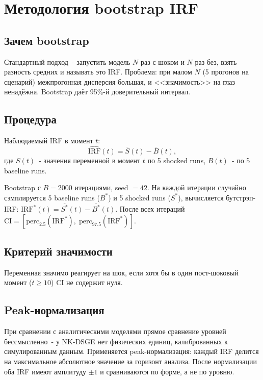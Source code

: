\documentclass[12pt, a4paper]{article}
\begin{document}
\section{Методология bootstrap IRF}

\subsection{Зачем bootstrap}

Стандартный подход~- запустить модель $N$ раз с шоком и $N$ раз без, взять разность средних и называть это IRF. Проблема: при малом $N$ (5 прогонов на сценарий) межпрогонная дисперсия большая, и <<значимость>> на глаз ненадёжна. Bootstrap даёт 95\%-й доверительный интервал.

\subsection{Процедура}

Наблюдаемый IRF в момент $t$:
\begin{equation}
\widehat{\text{IRF}}(t) = \overline{S}(t) - \overline{B}(t),
\end{equation}
где $S(t)$~- значения переменной в момент $t$ по 5 shocked runs, $B(t)$~- по 5 baseline runs.

Bootstrap с $B = 2000$ итерациями, seed $= 42$. На каждой итерации случайно сэмплируется 5 baseline runs ($B^*$) и 5 shocked runs ($S^*$), вычисляется бутстрэп-IRF: $\text{IRF}^*(t) = \overline{S^*}(t) - \overline{B^*}(t)$. После всех итераций $\text{CI} = [\text{perc}_{2.5}(\text{IRF}^*),\; \text{perc}_{97.5}(\text{IRF}^*)]$.

\subsection{Критерий значимости}

Переменная значимо реагирует на шок, если хотя бы в один пост-шоковый момент ($t \ge 10$) CI не содержит нуля.

\subsection{Peak-нормализация}

При сравнении с аналитическими моделями прямое сравнение уровней бессмысленно~- у NK-DSGE нет физических единиц, калиброванных к симулированным данным. Применяется peak-нормализация: каждый IRF делится на максимальное абсолютное значение за горизонт анализа. После нормализации оба IRF имеют амплитуду $\pm 1$ и сравниваются по форме, а не по уровню.
\end{document}
